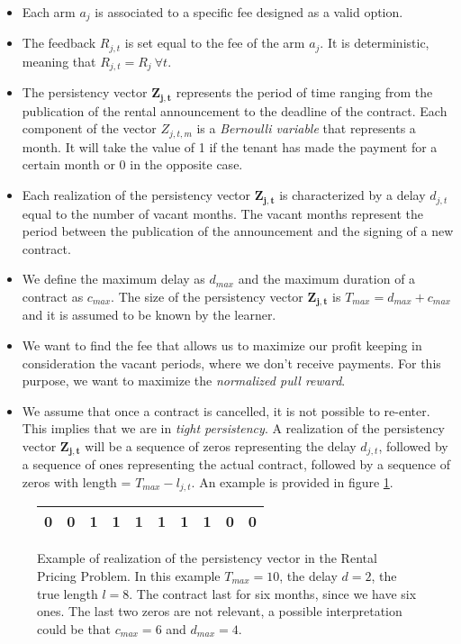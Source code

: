 \begin{itemize}
	\item Each arm $a_j$ is associated to a specific fee designed as a valid option.
	\item The feedback $R_{j,t}$ is set equal to the fee of the arm $a_j$. It is deterministic, meaning that $R_{j,t} = R_j \ \forall t$.  
	\item The persistency vector $\boldsymbol{Z_{j,t}}$ represents the period of time ranging from the publication of the rental announcement to the deadline of the contract. Each component of the vector $Z_{j,t,m}$ is a \emph{Bernoulli variable} that represents a month. It will take the value of 1 if the tenant has made the payment for a certain month or 0 in the opposite case.
	\item Each realization of the persistency vector $\boldsymbol{Z_{j,t}}$ is characterized by a delay $d_{j,t}$ equal to the number of vacant months. The vacant months represent the period between the publication of the announcement and the signing of a new contract.
	\item We define the maximum delay as $d_{max}$ and the maximum duration of a contract as $c_{max}$. The size of the persistency vector $\boldsymbol{Z_{j,t}}$ is $T_{max} = d_{max} + c_{max}$ and it is assumed to be known by the learner.
	\item We want to find the fee that allows us to maximize our profit keeping in consideration the vacant periods, where we don't receive payments. For this purpose, we want to maximize the \emph{normalized pull reward}.
	\item We assume that once a contract is cancelled, it is not possible to re-enter. This implies that we are in \emph{tight persistency}. A realization of the persistency vector $\boldsymbol{Z_{j,t}}$ will be a sequence of zeros representing the delay $d_{j,t}$, followed by a sequence of ones representing the actual  contract, followed by a sequence of zeros with length = $T_{max}-l_{j,t}$. An example is provided in figure \ref{bucket_affitto}.
\end{itemize}
 	


\begin{figure}[h]
	\centering
	
	

		\begin{tabular}{|cccccccccc|}
			\hline
			0 & 0 & 1 & 1 & 1 & 1 & 1 & 1 & 0 & 0 \\ \hline
		\end{tabular}
	
	
	
	
	\caption{Example of realization of the persistency vector in the Rental Pricing Problem. In this example $T_{max}=10$, the delay $d=2$, the true length $l=8$. The contract last for six months, since we have six ones. The last two zeros are not relevant, a possible interpretation could be that $c_{max}=6$ and $d_{max}=4$.}
	\label{bucket_affitto}
\end{figure}



